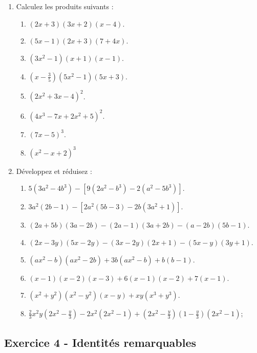 \documentclass[12 pt]{extarticle}
\theoremstyle{plain}
\begin{document}
\begin{enumerate}
\begin{enumerate}
\end{enumerate}
\item Calculez les produits suivants : 
\begin{enumerate}
\item $(2x+3)(3x+2)(x-4)$.
\item $(5x-1)(2x+3)(7+4x)$.
\item $(3x^2-1)(x+1)(x-1)$. 
\item $\left(x-\frac35\right)(5x^2-1)(5x+3)$.
\item $(2x^2+3x-4)^2$. 
\item $(4x^3-7x+2x^2+5)^2$. 
\item $(7x-5)^3$. 
\item $(x^2-x+2)^3$
\end{enumerate}
\item Développez et réduisez : 
\begin{enumerate}
\item $5(3a^2-4b^3)-[9(2a^2-b^3)-2(a^2-5b^3)]$.
\item $3a^2(2b-1)-[2a^2(5b-3)-2b(3a^2+1)]$.
\item $(2a+5b)(3a-2b)-(2a-1)(3a+2b)-(a-2b)(5b-1)$.
\item $(2x-3y)(5x-2y)-(3x-2y)(2x+1)-(5x-y)(3y+1)$.
\item $(ax^2-b)(ax^2-2b)+3b(ax^2-b)+b(b-1)$.
\item $(x-1)(x-2)(x-3)+6(x-1)(x-2)+7(x-1)$.
\item $(x^2+y^2)(x^2-y^2)(x-y)+xy(x^3+y^3)$.
\item $\frac23x^2y\left(2x^2-\frac{y}3\right)-2x^2(2x^2-1)+\left(2x^2-\frac{y}3\right)\left(1-\frac{y}3\right)(2x^2-1)$;
\end{enumerate}
\end{enumerate}

\subsection*{Exercice 4 - Identités remarquables}
\end{document}
